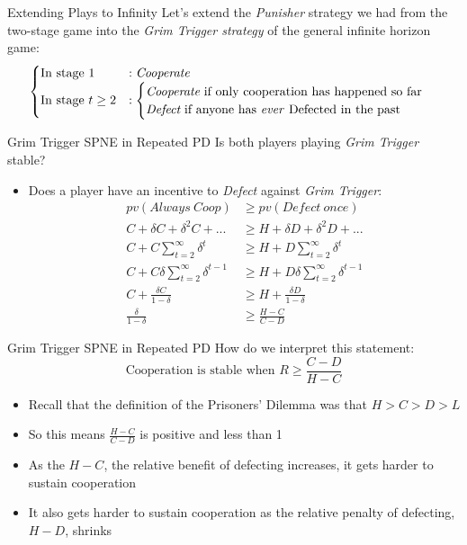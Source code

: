 \begin{frame}{Extending Plays to Infinity}
   Let's extend the \textit{Punisher} strategy we had from the two-stage game 
   into the \textit{Grim Trigger strategy} of the general infinite horizon game:
  \begin{align*}
    \begin{cases}
      \text{In stage } 1 & : \textit{Cooperate} \\ 
      \text{In stage } t \geq 2 & : 
      \begin{cases}
        \textit{Cooperate} \text{  if only cooperation has happened so far} \\ 
        \textit{Defect} \text{  if anyone has \textit{ever} Defected in the past}
      \end{cases}
    \end{cases}
  \end{align*}
\end{frame}

\begin{frame}{Grim Trigger SPNE in Repeated PD}
  Is both players playing \textit{Grim Trigger} stable?
  \begin{itemize}
    \item Does a player have an incentive to \textit{Defect} against \textit{Grim Trigger}:
    \vspace{-5mm}
    \begin{align*}
      pv(Always~Coop) & \geq pv(Defect~once) \\
      C + \delta C + \delta^2 C + ...      & \geq H + \delta D + \delta^2 D + ...\\
      C + C \sum_{t=2}^{\infty} \delta^{t} & \geq H + D \sum_{t=2}^{\infty} \delta^{t} \\ 
      C + C \delta \sum_{t=2}^{\infty} \delta^{t-1} & \geq H + D \delta \sum_{t=2}^{\infty} \delta^{t-1} \\ 
      C + \frac{\delta C}{1 - \delta} & \geq H + \frac{\delta D}{1 - \delta} \\
      \frac{\delta}{1-\delta} & \geq \frac{H - C}{C - D}
    \end{align*}
  \end{itemize}
\end{frame}

\begin{frame}{Grim Trigger SPNE in Repeated PD}
  How do we interpret this statement:
  $$\text{Cooperation is stable when } R \geq \frac{C - D}{H - C}  $$ 
  \begin{itemize}
    \item Recall that the definition of the Prisoners' Dilemma was that $H > C > D > L$
    \item So this means $\frac{H - C}{C - D}$ is positive and less than 1 
    \item As the $H - C$, the relative benefit of defecting increases,
    it gets harder to sustain cooperation
    \item It also gets harder to sustain cooperation as the relative penalty of defecting, $H - D$, shrinks 
  \end{itemize}
\end{frame}

